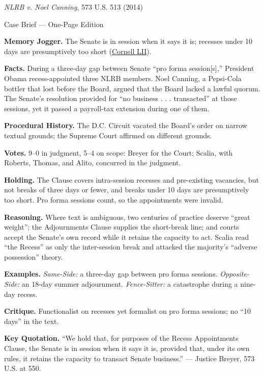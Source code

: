\documentclass[12pt]{article}
\begin{document}
\begin{center}
{\Large \textit{NLRB v. Noel Canning}, 573 U.S. 513 (2014)\par}
\vspace{0.3em}
{\normalsize Case Brief --- One-Page Edition\par}
\end{center}

\textbf{Memory Jogger.} The Senate is in session when it says it is; recesses under 10 days are presumptively too short (\href{https://www.law.cornell.edu/supremecourt/text/12-1281}{Cornell LII}).

\textbf{Facts.} During a three-day gap between Senate ``pro forma session[s],'' President Obama recess-appointed three NLRB members. Noel Canning, a Pepsi-Cola bottler that lost before the Board, argued that the Board lacked a lawful quorum. The Senate's resolution provided for ``no business . . . transacted'' at those sessions, yet it passed a payroll-tax extension during one of them.

\textbf{Procedural History.} The D.C. Circuit vacated the Board's order on narrow textual grounds; the Supreme Court affirmed on different grounds.

\textbf{Votes.} 9--0 in judgment, 5--4 on scope: Breyer for the Court; Scalia, with Roberts, Thomas, and Alito, concurred in the judgment.

\textbf{Holding.} The Clause covers intra-session recesses and pre-existing vacancies, but not breaks of three days or fewer, and breaks under 10 days are presumptively too short. Pro forma sessions count, so the appointments were invalid.

\textbf{Reasoning.} Where text is ambiguous, two centuries of practice deserve ``great weight''; the Adjournments Clause supplies the short-break line; and courts accept the Senate's own record while it retains the capacity to act. Scalia read ``the Recess'' as only the inter-session break and attacked the majority's ``adverse possession'' theory.

\textbf{Examples.} \emph{Same-Side:} a three-day gap between pro forma sessions. \emph{Opposite-Side:} an 18-day summer adjournment. \emph{Fence-Sitter:} a catastrophe during a nine-day recess.

\textbf{Critique.} Functionalist on recesses yet formalist on pro forma sessions; no ``10 days'' in the text.

\textbf{Key Quotation.} ``We hold that, for purposes of the Recess Appointments Clause, the Senate is in session when it says it is, provided that, under its own rules, it retains the capacity to transact Senate business.'' --- Justice Breyer, 573 U.S. at 550.
\end{document}
